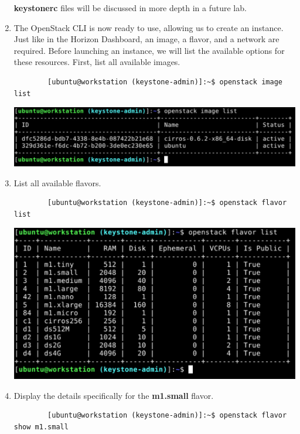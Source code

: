 \documentclass[letterpaper, 12pt]{article}
\begin{document}
\begin{enumerate}
    \begin{notebox}
        \textbf{keystonerc} files will be discussed in more depth in a future lab.
    \end{notebox}

    \item The OpenStack CLI is now ready to use, allowing us to create an instance.
    Just like in the Horizon Dashboard, an image, a flavor, and a network are required.
    Before launching an instance, we will list the available options for these resources.
    First, list all available images.
    \begin{lstlisting}
        [ubuntu@workstation (keystone-admin)]:~$ openstack image list
    \end{lstlisting}

    \begin{center}
        \includegraphics[width=\linewidth]{images/part2/step3.png}
    \end{center}

    \item List all available flavors.
    \begin{lstlisting}
        [ubuntu@workstation (keystone-admin)]:~$ openstack flavor list
    \end{lstlisting}

    \begin{center}
        \includegraphics[width=\linewidth]{images/part2/step4.png}
    \end{center}

    \item Display the details specifically for the \textbf{m1.small} flavor.
    \begin{lstlisting}
        [ubuntu@workstation (keystone-admin)]:~$ openstack flavor show m1.small
    \end{lstlisting}


\end{enumerate}
\end{document}
